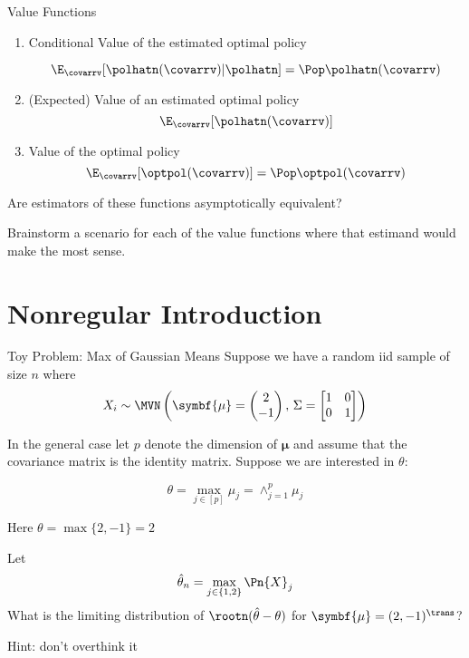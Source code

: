 \documentclass[aspectratio=169, professionalfonts]{beamer}
\begin{document}
\begin{frame}{Value Functions}
	\begin{enumerate}
		\item Conditional Value of the estimated optimal policy

		      $$\E_{\covarrv}[\polhatn(\covarrv) \vert \polhatn] = \Pop \polhatn(\covarrv)$$

		\item (Expected) Value of an estimated optimal policy
		      $$\E_{\covarrv}[\polhatn(\covarrv)]$$

		\item Value of the optimal policy
		      $$\E_{\covarrv}[\optpol(\covarrv)] = \Pop \optpol(\covarrv)$$
	\end{enumerate}

	\vfill \pause

	Are estimators of these functions asymptotically equivalent?

	\vfill \pause
	Brainstorm a scenario for each of the value functions where that estimand would
	make the most sense.
\end{frame}

\section{Nonregular Introduction}
\begin{frame}{Toy Problem: Max of Gaussian Means}
	Suppose we have a random iid sample of size $n$ where
	\begin{equation*}
		X_i \sim \MVN \left(\symbf{\mu} = \begin{pmatrix}2 \\ -1 \end{pmatrix},\, \Sigma = \begin{bmatrix}1 & 0
               \\ 0 & 1\end{bmatrix} \right)
	\end{equation*}

	\vfill
	\pause

	In the general case let $p$ denote the dimension of $\symbf{\mu}$ and assume that
	the covariance matrix is the identity matrix. Suppose we are interested in $\theta$:

	$$\theta = \max_{j \in
			[p]} \mu_j = \displaystyle \land_{j = 1}^{p} \mu_j$$
	\vfill

	Here $\theta = \max \{2, -1\} = 2$

	\vfill
	\pause
	Let $$\hat{\theta}_n = \max_{j \in \{1, 2 \}} \Pn {X}_j $$
	\vfill
	\pause
	What is the limiting distribution of $\rootn (\hat{\theta} - \theta)$ for $\symbf{\mu} =
		(2, -1 )^{\trans}$?

	Hint: don't overthink it
\end{frame}
\end{document}
